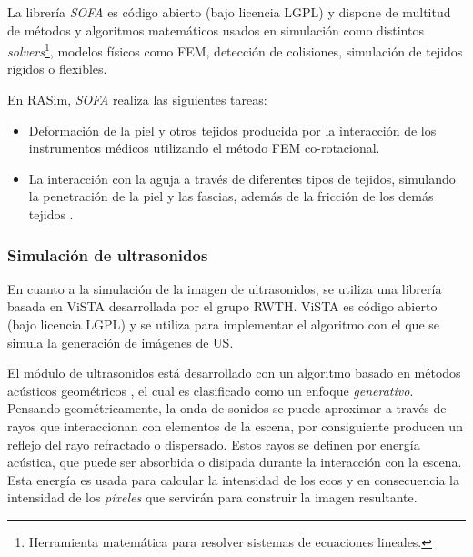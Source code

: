 La librería \emph{SOFA} es código abierto (bajo licencia \ac{LGPL}) y dispone de multitud de métodos y algoritmos matemáticos usados en simulación como distintos \emph{solvers}\footnote{Herramienta matemática para resolver sistemas de ecuaciones lineales.}, modelos físicos como \ac{FEM}, detección de colisiones, simulación de tejidos rígidos o flexibles.

En \ac{RASim}, \emph{SOFA} realiza las siguientes tareas:
\begin{itemize}
    \item Deformación de la piel y otros tejidos producida por la interacción de los instrumentos médicos utilizando el método \ac{FEM} co-rotacional.
    \item La interacción con la aguja a través de diferentes tipos de tejidos, simulando la penetración de la piel y las fascias, además de la fricción de los demás tejidos \cite{needleinsertion}.
    
\end{itemize}

\subsubsection{Simulación de ultrasonidos} 

En cuanto a la simulación de la imagen de ultrasonidos, se utiliza una librería basada en \ac{ViSTA} desarrollada por el grupo \ac{RWTH}. \ac{ViSTA} es código abierto (bajo licencia \ac{LGPL}) y se utiliza para implementar el algoritmo con el que se simula la generación de imágenes de \ac{US}.

El módulo de ultrasonidos está desarrollado con un algoritmo basado en métodos acústicos geométricos \cite{Law2015}, el cual es clasificado como un enfoque \emph{generativo}. Pensando geométricamente, la onda de sonidos se puede aproximar a través de rayos que interaccionan con elementos de la escena, por consiguiente producen un reflejo del rayo refractado o dispersado. Estos rayos se definen por energía acústica, que puede ser absorbida o disipada durante la interacción con la escena. Esta energía es usada para calcular la intensidad de los ecos y en consecuencia la intensidad de los \emph{píxeles} que servirán para construir la imagen resultante.

